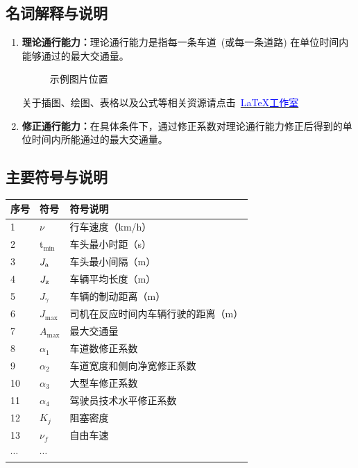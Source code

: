 \documentclass[a4paper]{nmmcm}
\newcommand\wordc[1]{\textbf{#1}}
\newcommand{\headcol}{\rowcolor{tableheadcolor}}
\begin{document}
\subsection{名词解释与说明}
\begin{enumerate}
\item \wordc{理论通行能力：}理论通行能力是指每一条车道~(或每一条道路) 在单位时间内
能够通过的最大交通量。

\begin{figure}[h!t]
\centerline{}
\caption{示例图片位置}
\end{figure}

关于插图、绘图、表格以及公式等相关资源请点击~\href{http://www.latexstudio.net}{\textcolor{blue}{\LaTeX{}工作室}}

\item \wordc{修正通行能力：}在具体条件下，通过修正系数对理论通行能力修正后得到的单
位时间内所能通过的最大交通量。

\end{enumerate}
\subsection{主要符号与说明}

\begin{table}[h!]
  \centering
  \small
  \begin{tabular}{p{60pt}<{\centering}|p{60pt}<{\centering}p{180pt}<{\raggedright}}
   \hline
   \headcol 序号 & 符号 & 符号说明 \\
   \hline
    1 & $\nu$ & 行车速度（km/h） \\
    2 & t$_{\min}$ & 车头最小时距（s） \\
    3 & $J_{\rm a}$ & 车头最小间隔（m） \\
    4 & $J_{\rm z}$ & 车辆平均长度（m） \\
    5 & $J_{\gamma}$ & 车辆的制动距离（m） \\
    6 & $J_{\max}$ & 司机在反应时间内车辆行驶的距离（m） \\
    7 & $A_{\max}$ & 最大交通量 \\
    8 & $\alpha_{1}$ & 车道数修正系数 \\
    9 & $\alpha_{2}$ & 车道宽度和侧向净宽修正系数 \\
    10 & $\alpha_{3}$ & 大型车修正系数 \\
    11 & $\alpha_{4}$ & 驾驶员技术水平修正系数 \\
    12 & $K_{j}$ & 阻塞密度 \\
    13 & $\nu_{f}$ & 自由车速 \\
    $\cdots$ & $\cdots$\\
    \hline
  \end{tabular}
  \label{symbol}
\end{table}
\end{document}
